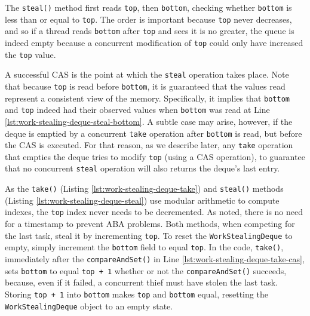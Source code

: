 The \lstinline!steal()! method first reads \lstinline!top!, then
\lstinline!bottom!, checking whether \lstinline!bottom! is less than
or equal to \lstinline!top!. The order is important because
\lstinline!top! never decreases, and so if a thread reads
\lstinline!bottom! after \lstinline!top! and sees it is no greater,
the queue is indeed empty because a concurrent modification of
\lstinline!top! could only have increased the \lstinline!top! value.

A successful CAS is the point at which the \lstinline!steal!
operation takes place. Note that because \lstinline!top! is read
before \lstinline!bottom!, it is guaranteed that the values read
represent a consistent view of the memory. Specifically, it implies
that \lstinline!bottom! and \lstinline!top! indeed had their observed
values when \lstinline!bottom! was read at Line
\ref{lst:work-stealing-deque-steal-bottom}. A subtle case may arise,
however, if the deque is emptied by a concurrent \lstinline!take!
operation after \lstinline!bottom! is read, but before the CAS is
executed. For that reason, as we describe later, any \lstinline!take!
operation that empties the deque tries to modify \lstinline!top!
(using a CAS operation), to guarantee that no concurrent
\lstinline!steal! operation will also returns the deque's last entry.



As the \lstinline!take()! (Listing \ref{lst:work-stealing-deque-take})
and \lstinline!steal()!  methods (Listing
\ref{lst:work-stealing-deque-steal}) use modular arithmetic to compute
indexes, the \lstinline!top! index never needs to be decremented. As
noted, there is no need for a timestamp to prevent ABA problems. Both
methods, when competing for the last task, steal it by incrementing
\lstinline!top!. To reset the \lstinline!WorkStealingDeque! to empty,
simply increment the \lstinline!bottom! field to equal
\lstinline!top!. In the code, \lstinline!take()!, immediately after
the \lstinline!compareAndSet()! in Line
\ref{lst:work-stealing-deque-take-cas}, sets \lstinline!bottom! to
equal \lstinline!top + 1! whether or not the
\lstinline!compareAndSet()! succeeds, because, even if it failed, a
concurrent thief must have stolen the last task. Storing
\lstinline!top + 1! into \lstinline!bottom! makes \lstinline!top! and
\lstinline!bottom! equal, resetting the \lstinline!WorkStealingDeque!
object to an empty state.


